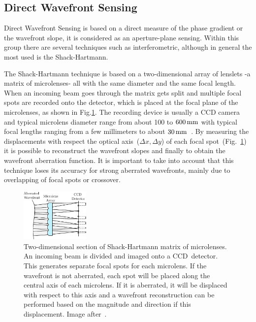 \subsection{Direct Wavefront Sensing}
\label{sec:WavefrontSensing}

Direct Wavefront Sensing is based on a direct measure of the phase gradient or the wavefront slope, it is considered as an aperture-plane sensing. Within this group there are several techniques such as interferometric, although in general the most used is the Shack-Hartmann. 

The Shack-Hartmann technique is based on a two-dimensional array of lenslets -a matrix of microlenses- all with the same diameter and the same focal length. When an incoming beam goes through the matrix gets split and multiple focal spots are recorded onto the detector, which is placed at the focal plane of the microlenses, as shown in Fig.\ref{fig:SH}. The recording device is usually a CCD camera and typical microlens diameter range from about 100 to $\unit[600]{mm}$ with typical focal lengths ranging from a few millimeters to about $\unit[30]{mm}$~\cite{AO_vision_science}. By measuring the displacements with respect the optical axis~($\Delta x, \Delta y$) of each focal spot~(Fig.~\ref{fig:SH}) it is possible to reconstruct the wavefront slopes and finally to obtain the wavefront aberration function. It is important to take into account that this technique loses its accuracy for strong aberrated wavefronts, mainly due to overlapping of focal spots or crossover.

\begin{figure}[htbp]
	\centering
		\includegraphics[width=0.30\textwidth]{images/SH}
	\caption{Two-dimensional section of Shack-Hartmann matrix of microlenses. An incoming beam is divided and imaged onto a CCD~detector. This generates separate focal spots for each microlens. If the wavefront is not aberrated, each spot will be placed along the central axis of each microlens. If it is aberrated, it will be displaced with respect to this axis and a wavefront reconstruction can be performed based on the magnitude and direction if this displacement. Image after~\cite{optical_shop_testing}.}
	\label{fig:SH}
\end{figure}

